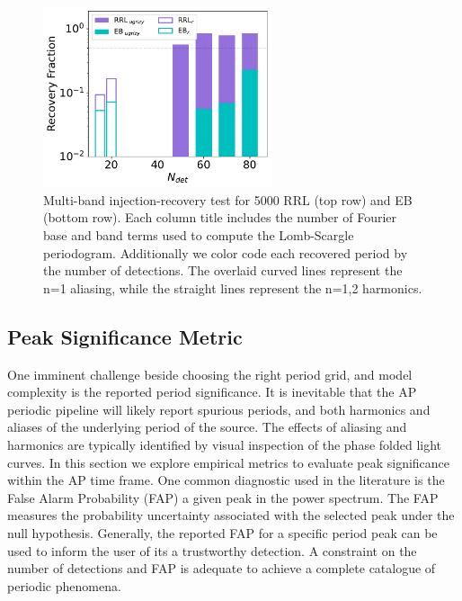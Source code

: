 \documentclass[DM,authoryear,toc]{lsstdoc}
\begin{document}

\begin{figure}
  \includegraphics[width=0.6\textwidth]{figures/multi_vs_single_rec_frac.pdf}
  \centering 
  \caption{Multi-band injection-recovery test for 5000 RRL (top row) and EB (bottom row). Each column title includes the number of Fourier base and band terms used to compute the Lomb-Scargle periodogram. Additionally we color code each recovered period by the number of detections. The overlaid curved lines represent the n=1 aliasing, while the straight lines represent the n=1,2 harmonics.}
\end{figure}

\subsection{Peak Significance Metric}
One imminent challenge beside choosing the right period grid, and model complexity is the reported period significance. It is inevitable that the AP periodic pipeline will likely report spurious periods, and both harmonics and aliases of the underlying period of the source. The effects of aliasing and harmonics are typically identified by visual inspection of the phase folded light curves. In this section we explore empirical metrics to evaluate peak significance within the AP time frame. One common diagnostic used in the literature is the False Alarm Probability (FAP) a given peak in the power spectrum. The FAP measures the probability uncertainty associated with the selected peak under the null hypothesis. Generally, the reported FAP for a specific period peak can be used to inform the user of its a trustworthy detection. A constraint on the number of detections and FAP is adequate to achieve a complete catalogue of periodic phenomena. 
\end{document}
